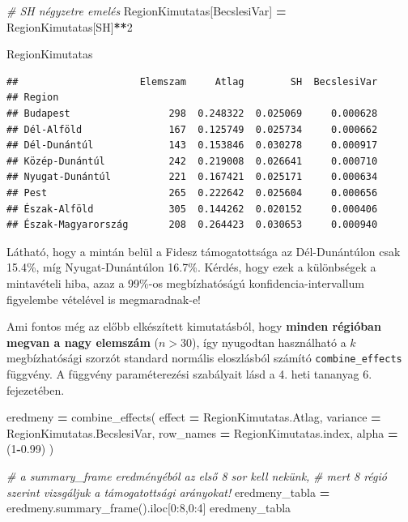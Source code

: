 \documentclass[
]{book}
\newenvironment{Shaded}{\begin{snugshade}}{\end{snugshade}}
\newcommand{\CommentTok}[1]{\textcolor[rgb]{0.56,0.35,0.01}{\textit{#1}}}
\newcommand{\DecValTok}[1]{\textcolor[rgb]{0.00,0.00,0.81}{#1}}
\newcommand{\FloatTok}[1]{\textcolor[rgb]{0.00,0.00,0.81}{#1}}
\newcommand{\NormalTok}[1]{#1}
\newcommand{\OperatorTok}[1]{\textcolor[rgb]{0.81,0.36,0.00}{\textbf{#1}}}
\newcommand{\StringTok}[1]{\textcolor[rgb]{0.31,0.60,0.02}{#1}}
\begin{document}
\begin{Shaded}
\begin{Highlighting}[]
\CommentTok{\# SH négyzetre emelés}
\NormalTok{RegionKimutatas[}\StringTok{\textquotesingle{}BecslesiVar\textquotesingle{}}\NormalTok{] }\OperatorTok{=}\NormalTok{ RegionKimutatas[}\StringTok{\textquotesingle{}SH\textquotesingle{}}\NormalTok{]}\OperatorTok{**}\DecValTok{2}

\NormalTok{RegionKimutatas}
\end{Highlighting}
\end{Shaded}

\begin{verbatim}
##                     Elemszam     Atlag        SH  BecslesiVar
## Region                                                       
## Budapest                 298  0.248322  0.025069     0.000628
## Dél-Alföld               167  0.125749  0.025734     0.000662
## Dél-Dunántúl             143  0.153846  0.030278     0.000917
## Közép-Dunántúl           242  0.219008  0.026641     0.000710
## Nyugat-Dunántúl          221  0.167421  0.025171     0.000634
## Pest                     265  0.222642  0.025604     0.000656
## Észak-Alföld             305  0.144262  0.020152     0.000406
## Észak-Magyarország       208  0.264423  0.030653     0.000940
\end{verbatim}

Látható, hogy a mintán belül a Fidesz támogatottsága az Dél-Dunántúlon csak 15.4\%, míg Nyugat-Dunántúlon 16.7\%. Kérdés, hogy ezek a különbségek a mintavételi hiba, azaz a 99\%-os megbízhatóságú konfidencia-intervallum figyelembe vételével is megmaradnak-e!

Ami fontos még az előbb elkészített kimutatásból, hogy \textbf{minden régióban megvan a nagy elemszám} (\(n>30\)), így nyugodtan használható a \(k\) megbízhatósági szorzót standard normális eloszlásból számító \texttt{combine\_effects} függvény. A függvény paraméterezési szabályait lásd a 4. heti tananyag 6. fejezetében.

\begin{Shaded}
\begin{Highlighting}[]
\NormalTok{eredmeny }\OperatorTok{=}\NormalTok{ combine\_effects(}
\NormalTok{  effect }\OperatorTok{=}\NormalTok{ RegionKimutatas.Atlag,}
\NormalTok{  variance }\OperatorTok{=}\NormalTok{ RegionKimutatas.BecslesiVar,}
\NormalTok{  row\_names }\OperatorTok{=}\NormalTok{ RegionKimutatas.index,}
\NormalTok{  alpha }\OperatorTok{=}\NormalTok{ (}\DecValTok{1}\OperatorTok{{-}}\FloatTok{0.99}\NormalTok{)}
\NormalTok{)}

\CommentTok{\# a summary\_frame eredményéból az első 8 sor kell nekünk,}
\CommentTok{\# mert 8 régió szerint vizsgáljuk a támogatottsági arányokat!}
\NormalTok{eredmeny\_tabla }\OperatorTok{=}\NormalTok{ eredmeny.summary\_frame().iloc[}\DecValTok{0}\NormalTok{:}\DecValTok{8}\NormalTok{,}\DecValTok{0}\NormalTok{:}\DecValTok{4}\NormalTok{]}
\NormalTok{eredmeny\_tabla}
\end{Highlighting}
\end{Shaded}
\end{document}
